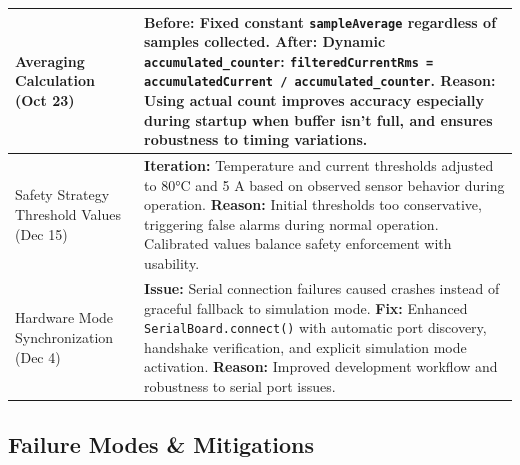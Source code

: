 \documentclass[11pt,a4paper]{article}
\begin{document}
\begin{longtable}{|L{0.2\textwidth}|p{0.75\textwidth}|}
\hline
Averaging Calculation (Oct 23) & \textbf{Before:} Fixed constant \texttt{sampleAverage} regardless of samples collected. \newline \textbf{After:} Dynamic \texttt{accumulated\_counter}: \texttt{filteredCurrentRms = accumulatedCurrent / accumulated\_counter}. \newline \textbf{Reason:} Using actual count improves accuracy especially during startup when buffer isn't full, and ensures robustness to timing variations. \\
\hline
Safety Strategy Threshold Values (Dec 15) & \textbf{Iteration:} Temperature and current thresholds adjusted to 80°C and 5 A based on observed sensor behavior during operation. \newline \textbf{Reason:} Initial thresholds too conservative, triggering false alarms during normal operation. Calibrated values balance safety enforcement with usability. \\
\hline
Hardware Mode Synchronization (Dec 4) & \textbf{Issue:} Serial connection failures caused crashes instead of graceful fallback to simulation mode. \newline \textbf{Fix:} Enhanced \texttt{SerialBoard.connect()} with automatic port discovery, handshake verification, and explicit simulation mode activation. \newline \textbf{Reason:} Improved development workflow and robustness to serial port issues. \\
\hline
\end{longtable}

\subsection{Failure Modes \& Mitigations}
\end{document}
